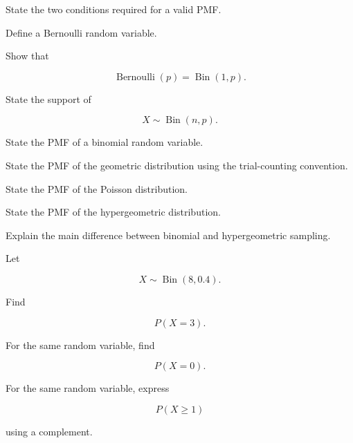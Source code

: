 \begin{exercise}[1]
State the two conditions required for a valid PMF.
\end{exercise}

\begin{exercise}[1]
Define a Bernoulli random variable.
\end{exercise}

\begin{exercise}[1]
Show that

\[
\operatorname{Bernoulli}(p)
=
\operatorname{Bin}(1,p).
\]
\end{exercise}

\begin{exercise}[1]
State the support of

\[
X\sim\operatorname{Bin}(n,p).
\]
\end{exercise}

\begin{exercise}[1]
State the PMF of a binomial random variable.
\end{exercise}

\begin{exercise}[1]
State the PMF of the geometric distribution using the trial-counting
convention.
\end{exercise}

\begin{exercise}[1]
State the PMF of the Poisson distribution.
\end{exercise}

\begin{exercise}[1]
State the PMF of the hypergeometric distribution.
\end{exercise}

\begin{exercise}[1]
Explain the main difference between binomial and hypergeometric
sampling.
\end{exercise}

\begin{exercise}[2]
Let

\[
X\sim\operatorname{Bin}(8,0.4).
\]

Find

\[
P(X=3).
\]
\end{exercise}

\begin{exercise}[2]
For the same random variable, find

\[
P(X=0).
\]
\end{exercise}

\begin{exercise}[2]
For the same random variable, express

\[
P(X\geq1)
\]

using a complement.
\end{exercise}


